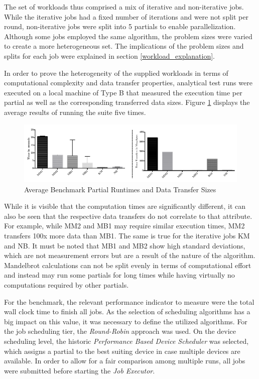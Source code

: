 The set of workloads thus comprised a mix of iterative and non-iterative jobs. While the iterative jobs had a fixed number of iterations and were not split per round, non-iterative jobs were split into 5 partials to enable parallelization. Although some jobs employed the same algorithm, the problem sizes were varied to create a more heterogeneous set. The implications of the problem sizes and splits for each job were explained in section \ref{workload_explanation}.

In order to prove the heterogeneity of the supplied workloads in terms of computational complexity and data transfer properties, analytical test runs were executed on a local machine of Type B that measured the execution time per partial as well as the corresponding transferred data sizes. Figure \ref{img:benchmark_kernel_attributes} displays the average results of running the suite five times.

\begin{figure}[H]

	\includegraphics[width=1.0\textwidth]{images/benchmark_kernel_data_transfers.pdf}
	\centering
	\caption{Average Benchmark Partial Runtimes and Data Transfer Sizes}
	\label{img:benchmark_kernel_attributes}
\end{figure}

While it is visible that the computation times are significantly different, it can also be seen that the respective data transfers do not correlate to that attribute. For example, while MM2 and MB1 may require similar execution times, MM2 transfers 100x more data than MB1. The same is true for the iterative jobs KM and NB. It must be noted that MB1 and MB2 show high standard deviations, which are not measurement errors but are a result of the nature of the algorithm. Mandelbrot calculations can not be split evenly in terms of computational effort and instead may run some partials for long times while having virtually no computations required by other partials.

For the benchmark, the relevant performance indicator to measure were the total wall clock time to finish all jobs. As the selection of scheduling algorithms has a big impact on this value, it was necessary to define the utilized algorithms. For the job scheduling tier, the \textit{Round-Robin} approach was used. On the device scheduling level, the historic \textit{Performance Based Device Scheduler} was selected, which assigns a partial to the best suiting device in case multiple devices are available. In order to allow for a fair comparison among multiple runs, all jobs were submitted before starting the \textit{Job Executor}.

